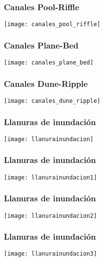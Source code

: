 \documentclass{beamer}
\begin{document}
\begin{frame}
\frametitle{Canales Pool-Riffle}
\begin{center}
   	\texttt{[image: canales\_pool\_riffle]}
\end{center}
\end{frame}
\begin{frame}
\frametitle{Canales Plane-Bed}
\begin{center}
   	\texttt{[image: canales\_plane\_bed]}
\end{center}
\end{frame}
\begin{frame}
\frametitle{Canales Dune-Ripple}
\begin{center}
   	\texttt{[image: canales\_dune\_ripple]}
\end{center}
\end{frame}
\begin{frame}
\frametitle{Llanuras de inundación}
\begin{center}
   	\texttt{[image: llanurainundacion]}
\end{center}
\end{frame}
\begin{frame}
\frametitle{Llanuras de inundación}
\begin{center}
   	\texttt{[image: llanurainundacion1]}
\end{center}
\end{frame}
\begin{frame}
\frametitle{Llanuras de inundación}
\begin{center}
   	\texttt{[image: llanurainundacion2]}
\end{center}
\end{frame}
\begin{frame}
\frametitle{Llanuras de inundación}
\begin{center}
   	\texttt{[image: llanurainundacion3]}
\end{center}
\end{frame}
\end{document}

